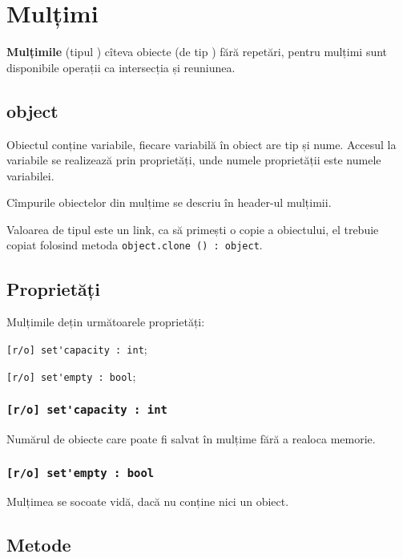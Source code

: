 \section{Mulțimi}

{\bf Mulțimile} (tipul \set) cîteva obiecte (de tip \object) fără repetări, pentru mulțimi sunt disponibile operații ca intersecția și reuniunea.

\subsection{{\color{lightblue} object}}

Obiectul conține variabile, fiecare variabilă în obiect are tip și nume. Accesul la variabile se realizează prin proprietăți, unde numele proprietății este numele variabilei.

Cîmpurile obiectelor din mulțime se descriu în header-ul mulțimii.

Valoarea de tipul \object{} este un link, ca să primești o copie a obiectului, el trebuie copiat folosind metoda \lstinline|object.clone () : object|.

\subsection{Proprietăți}

Mulțimile dețin următoarele proprietăți:
\begin{icItems}
\item \lstinline|[r/o] set'capacity : int|;
\item \lstinline|[r/o] set'empty : bool|;
\end{icItems}

\subsubsection{\lstinline|[r/o] set'capacity : int|}

Numărul de obiecte care poate fi salvat în mulțime fără a realoca memorie.

\subsubsection{\lstinline|[r/o] set'empty : bool|}

Mulțimea se socoate vidă, dacă nu conține nici un obiect.

\subsection{Metode}

